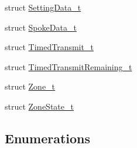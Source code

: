 \begin{DoxyCompactItemize}
struct \mbox{\hyperlink{struct_quantum_lib_1_1_setting_data__t}{Setting\+Data\+\_\+t}}
\item 
struct \mbox{\hyperlink{struct_quantum_lib_1_1_spoke_data__t}{Spoke\+Data\+\_\+t}}
\item 
struct \mbox{\hyperlink{struct_quantum_lib_1_1_timed_transmit__t}{Timed\+Transmit\+\_\+t}}
\item 
struct \mbox{\hyperlink{struct_quantum_lib_1_1_timed_transmit_remaining__t}{Timed\+Transmit\+Remaining\+\_\+t}}
\item 
struct \mbox{\hyperlink{struct_quantum_lib_1_1_zone__t}{Zone\+\_\+t}}
\item 
struct \mbox{\hyperlink{struct_quantum_lib_1_1_zone_state__t}{Zone\+State\+\_\+t}}
\end{DoxyCompactItemize}
\subsection*{Enumerations}
